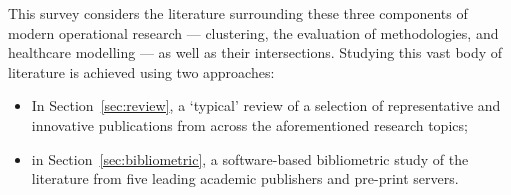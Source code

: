 This survey considers the literature surrounding these three components of
modern operational research --- clustering, the evaluation of methodologies, and
healthcare modelling --- as well as their intersections. Studying this vast body
of literature is achieved using two approaches:

\begin{itemize}
    \item In Section~\ref{sec:review}, a `typical' review of a selection of
        representative and innovative publications from across the
        aforementioned research topics;
    \item in Section~\ref{sec:bibliometric}, a software-based bibliometric study
        of the literature from five leading academic publishers and pre-print
        servers.
\end{itemize}

